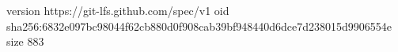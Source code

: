 version https://git-lfs.github.com/spec/v1
oid sha256:6832e097bc98044f62cb880d0f908cab39bf948440d6dce7d238015d9906554e
size 883
